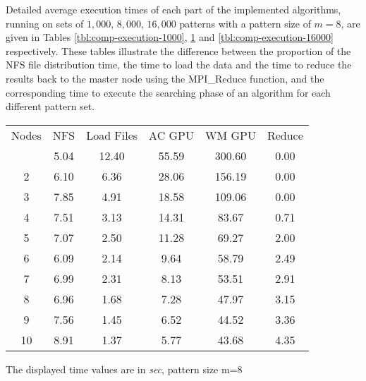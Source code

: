 \documentclass{ws-ijait}
\begin{document}
Detailed average execution times of each part of the implemented algorithms, running on sets of $1,000$, $8,000$, $16,000$ patterns with a pattern size of $m=8$, are given in Tables \ref{tbl:comp-execution-1000}, \ref{tbl:comp-execution-8000} and \ref{tbl:comp-execution-16000} respectively. These tables illustrate the difference between the proportion of the NFS file distribution time, the time to load the data and the time to reduce the results back to the master node using the MPI\_Reduce function, and the corresponding time to execute the searching phase of an algorithm for each different pattern set.

\begin{table}[h]
{\begin{tabular}{@{}c |ccccc@{}} \toprule
Nodes & NFS & Load Files & AC GPU & WM GPU & Reduce\\
\colrule
1 & 5.04 & 12.40 & 55.59 & 300.60 & 0.00\\
2 & 6.10 & 6.36 & 28.06 & 156.19 & 0.00\\
3 & 7.85 & 4.91 & 18.58 & 109.06 & 0.00\\
4 & 7.51 & 3.13 & 14.31 & 83.67 & 0.71\\
5 & 7.07 & 2.50 & 11.28 & 69.27 & 2.00\\
6 & 6.09 & 2.14 & 9.64 & 58.79 & 2.49\\
7 & 6.99 & 2.31 & 8.13 & 53.51 & 2.91\\
8 & 6.96 & 1.68 & 7.28 & 47.97 & 3.15\\
9 & 7.56 & 1.45 & 6.52 & 44.52 & 3.36\\
10 & 8.91 & 1.37 & 5.77 & 43.68 & 4.35\\
\hline
\end{tabular}}
\begin{tabnote}
The displayed time values are in \textit{sec}, pattern size m=$8$
\end{tabnote}
\label{tbl:comp-execution-8000}
\end{table}
\end{document}
